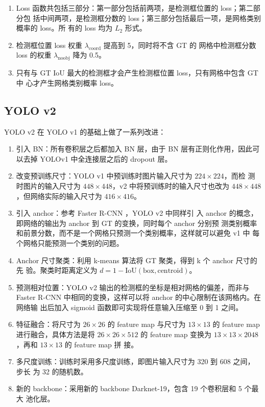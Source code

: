 \begin{enumerate}
  \item Loss 函数共包括三部分：第一部分包括前两项，是检测框位置的 loss；第二部分包
    括中间两项，是检测框分数的 loss；第三部分包括最后一项，是网格类别概率的 loss。所
    有的 loss 均为 $L_2$ 形式。
  \item 检测框位置 loss 权重 $\lambda_{\mathrm{coord}}$ 提高到 5，同时将不含 GT 的
    网格中检测框分数 loss 的权重 $\lambda_{\mathrm{noobj}}$ 降为 0.5。
  \item 只有与 GT IoU 最大的检测框才会产生检测框位置 loss，只有网格中包含 GT 中
    心才产生网格类别概率 loss。
\end{enumerate}

\subsection{YOLO v2}
\label{subsec:YOLOv2}
YOLO v2 在 YOLO v1 的基础上做了一系列改进：

\begin{enumerate}
  \item 引入 BN：所有卷积层之后都加入 BN 层，由于 BN 层有正则化作用，因此可以去掉
    YOLOv1 中全连接层之后的 dropout 层。
  \item 改变预训练尺寸：YOLO v1 中预训练时图片输入尺寸为 $224 \times 224$，而检
    测时图片的输入尺寸为 $448 \times 448$，v2 中将预训练时的输入尺寸也改为 $448
    \times 448$，但网络实际的输入尺寸为 $416 \times 416$。
  \item 引入 anchor：参考 Faster R-CNN \cite{2015-Faster-RCNN}，YOLO v2 中同样引
    入 anchor 的概念，即网络的输出为 anchor 到 GT 的变换，同时每个 anchor 分别预
    测类别概率和前景分数，而不是一个网格只预测一个类别概率，这样就可以避免 v1 中
    每个网格只能预测一个类别的问题。
  \item Anchor 尺寸聚类：利用 k-means 算法将 GT 聚类，得到 k 个 anchor 尺寸的先
    验。聚类时距离定义为 $d = 1 - \mathrm{IoU}(\mathrm{box}, \mathrm{centroid})$。
  \item 预测相对位置：YOLO v2 输出的检测框的坐标是相对网格的偏差，而非与
    Faster R-CNN 中相同的变换，这样可以将 anchor 的中心限制在该网格内。在网络输
    出后加入 sigmoid 函数即可实现将任意输入压缩至 0 到 1 之间。
  \item 特征融合：将尺寸为 $26 \times 26$ 的 feature map 与尺寸为 $13 \times 13$
    的 feature map 进行融合，具体方法是将 $26 \times 26 \times 512$ 的 feature
    map 变换为 $13 \times 13 \times 2048$，再和 $13 \times 13$ 的 feature map 拼
    接。
  \item 多尺度训练：训练时采用多尺度训练，即图片输入尺寸为 320 到 608 之间，步长
    为 32 的随机数。
  \item 新的 backbone：采用新的 backbone Darknet-19，包含 19 个卷积层和 5 个最大
    池化层。
\end{enumerate}

